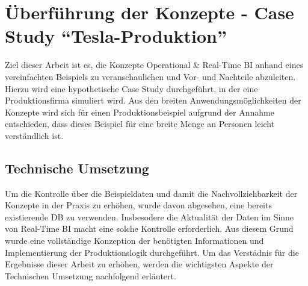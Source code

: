 \chapter{Überführung der Konzepte - Case Study \enquote{Tesla-Produktion}}
Ziel dieser Arbeit ist es, die Konzepte Operational \& Real-Time \ac{BI} anhand eines vereinfachten Beispiels zu veranschaulichen und Vor- und Nachteile abzuleiten. Hierzu wird eine hypothetische Case Study durchgeführt, in der eine Produktionsfirma simuliert wird. Aus den breiten Anwendungsmöglichkeiten der Konzepte wird sich für einen Produktionsbeispiel aufgrund der Annahme entschieden, dass dieses Beispiel für eine breite Menge an Personen leicht verständlich ist.
\section{Technische Umsetzung}
Um die Kontrolle über die Beispieldaten und damit die Nachvollziehbarkeit der Konzepte in der Praxis zu erhöhen, wurde davon abgesehen, eine bereits existierende \ac{DB} zu verwenden. Insbesodere die Aktualität der Daten im Sinne von Real-Time \ac{BI} macht eine solche Kontrolle erforderlich.
Aus diesem Grund wurde eine vollständige Konzeption der benötigten Informationen und Implementierung der Produktionslogik durchgeführt. Um das Verstädnis für die Ergebnisse dieser Arbeit zu erhöhen, werden die wichtigsten Aspekte der Technischen Umsetzung nachfolgend erläutert.
